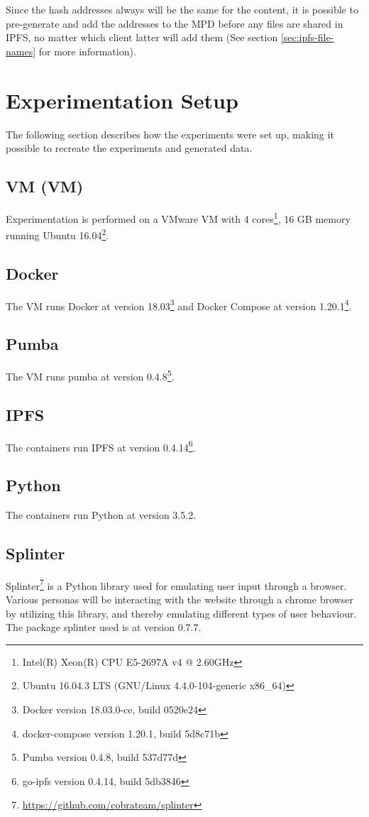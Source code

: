 Since the hash addresses always will be the same for the content, it is possible to pre-generate and add the addresses to the \acs{MPD} before any files are shared in \acs{IPFS}, no matter which client latter will add them (See section \ref{sec:ipfs-file-names} for more information).

\section{Experimentation Setup}
The following section describes how the experiments were set up, making it possible to recreate the experiments and generated data.

\subsection{\acl{VM} (\acs{VM})}
Experimentation is performed on a VMware \acs{VM} with 4 cores\footnote{Intel(R) Xeon(R) CPU E5-2697A v4 @ 2.60GHz}, 16 GB memory running Ubuntu 16.04\footnote{Ubuntu 16.04.3 LTS (GNU/Linux 4.4.0-104-generic x86\_64)}.

\subsection{Docker}
The \acs{VM} runs Docker at version 18.03\footnote{Docker version 18.03.0-ce, build 0520e24} and Docker Compose at version 1.20.1\footnote{docker-compose version 1.20.1, build 5d8c71b}.

\subsection{Pumba}
The \acs{VM} runs pumba at version 0.4.8\footnote{Pumba version 0.4.8, build 537d77d}.


\subsection{IPFS}
The containers run \acs{IPFS} at version 0.4.14\footnote{go-ipfs version 0.4.14, build 5db3846}.

\subsection{Python}
The containers run Python at version 3.5.2.

\subsection{Splinter}
Splinter\footnote{\url{https://github.com/cobrateam/splinter}} is a Python library used for emulating user input through a browser. Various personas will be interacting with the website through a chrome browser by utilizing this library, and thereby emulating different types of user behaviour.
The package splinter used is at version 0.7.7.

